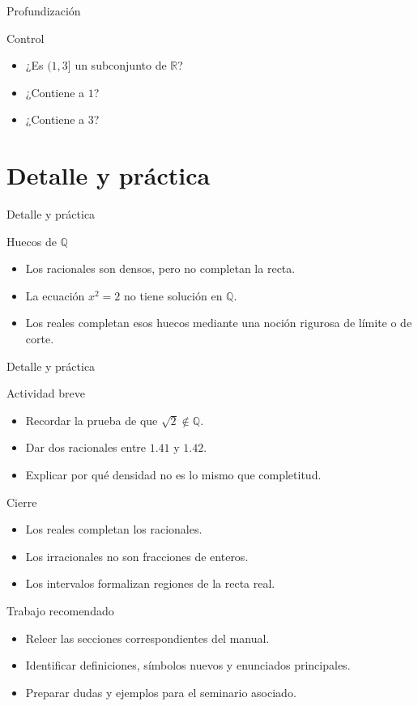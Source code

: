 \documentclass[aspectratio=169,11pt]{beamer}
\begin{document}
\begin{frame}{Profundización}
\begin{block}{Control}
\begin{itemize}
  \item ¿Es \((1,3]\) un subconjunto de \(\mathbb{R}\)?
  \item ¿Contiene a \(1\)?
  \item ¿Contiene a \(3\)?
\end{itemize}
\end{block}
\end{frame}


\section{Detalle y práctica}

\begin{frame}{Detalle y práctica}
\begin{block}{Huecos de \(\mathbb{Q}\)}
\begin{itemize}
  \item Los racionales son densos, pero no completan la recta.
  \item La ecuación \(x^2=2\) no tiene solución en \(\mathbb{Q}\).
  \item Los reales completan esos huecos mediante una noción rigurosa de límite o de corte.
\end{itemize}
\end{block}
\end{frame}

\begin{frame}{Detalle y práctica}
\begin{block}{Actividad breve}
\begin{itemize}
  \item Recordar la prueba de que \(\sqrt{2}\notin\mathbb{Q}\).
  \item Dar dos racionales entre \(1.41\) y \(1.42\).
  \item Explicar por qué densidad no es lo mismo que completitud.
\end{itemize}
\end{block}
\end{frame}

\begin{frame}{Cierre}
\begin{itemize}
  \item Los reales completan los racionales.
  \item Los irracionales no son fracciones de enteros.
  \item Los intervalos formalizan regiones de la recta real.
\end{itemize}
\end{frame}

\begin{frame}{Trabajo recomendado}
\begin{itemize}
  \item Releer las secciones correspondientes del manual.
  \item Identificar definiciones, símbolos nuevos y enunciados principales.
  \item Preparar dudas y ejemplos para el seminario asociado.
\end{itemize}
\end{frame}
\end{document}
